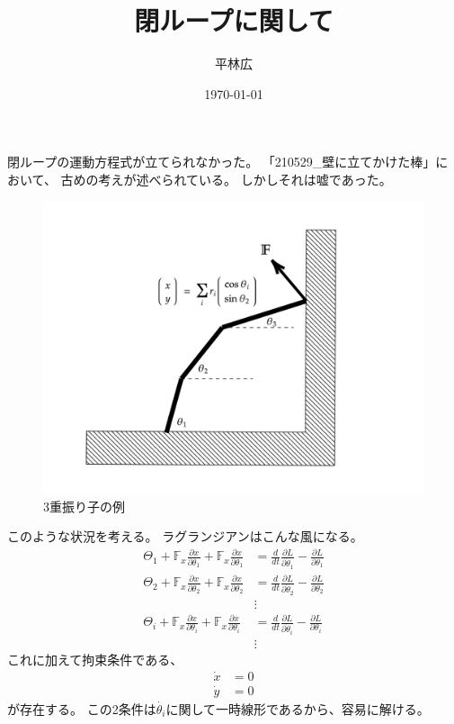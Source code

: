 \documentclass[a4paper,11pt]{jsarticle}
\begin{document}
\title{閉ループに関して}
\author{平林広}
\date{\today}
\maketitle

閉ループの運動方程式が立てられなかった。
「210529\_壁に立てかけた棒」において、
古めの考えが述べられている。
しかしそれは嘘であった。

\begin{figure}[h]
  \centering
  \includegraphics[width = 1\textwidth]{ex_Triple_Pendulum.png}
  \caption{3重振り子の例}
  \label{fig:ex_Triple_Pendulum}
\end{figure}

このような状況を考える。
ラグランジアンはこんな風になる。
\begin{align*}
  \Theta_1 + \mathbb{F}_x \frac{\partial x}{\partial \theta_1} + \mathbb{F}_x \frac{\partial x}{\partial \theta_1}
  & = \frac{d}{dt}\frac{\partial L}{\partial \dot{\theta}_1} - \frac{\partial L}{\partial \theta_1}
  \\ \Theta_2 + \mathbb{F}_x \frac{\partial x}{\partial \theta_2} + \mathbb{F}_x \frac{\partial x}{\partial \theta_2}
  & = \frac{d}{dt}\frac{\partial L}{\partial \dot{\theta}_2} - \frac{\partial L}{\partial \theta_2}
  \\ & \vdots
  \\ \Theta_i + \mathbb{F}_x \frac{\partial x}{\partial \theta_i} + \mathbb{F}_x \frac{\partial x}{\partial \theta_i}
  & = \frac{d}{dt}\frac{\partial L}{\partial \dot{\theta}_i} - \frac{\partial L}{\partial \theta_i}
  \\ & \vdots
\end{align*}
これに加えて拘束条件である、
\begin{align*}
  \dot{x} &= 0 \\
  \dot{y} &= 0
\end{align*}
が存在する。
この2条件は$\dot{\theta_i}$に関して一時線形であるから、容易に解ける。
\end{document}
